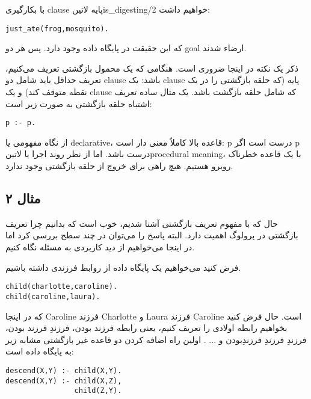 با بکارگیری clause‌ پایه ‌لاتین{is\_digesting/2} خواهیم داشت:

\begin{latin}
\begin{lstlisting}
just_ate(frog,mosquito).
\end{lstlisting}
\end{latin}

که این حقیقت در پایگاه داده وجود دارد. پس هر دو goal ارضاء شدند.

ذکر یک نکته در اینجا ضروری است. هنگامی که یک محمول بازگشتی تعریف می‌کنیم، تعریف حداقل باید شامل دو clause باشد: یک clause پایه (که حلقه بازگشتی را در یک نقطه متوقف کند) و یک clause که شامل حلقه بازگشت باشد. یک مثال ساده تعریف اشتباه حلقه بازگشتی به صورت زیر است:

\begin{latin}
\begin{lstlisting}
p :- p.
\end{lstlisting}
\end{latin}

از نگاه مفهومی یا declarative، قاعده بالا کاملاً معنی دار است: p درست است اگر p‌ درست باشد. اما از نظر روند اجرا یا ‌لاتین{procedural meaning}، با یک قاعده خطرناک روبرو هستیم. هیچ راهی برای خروج از حلقه بازگشتی وجود ندارد.

\subsection{مثال ۲}
حال که با مفهوم تعریف بازگشتی آشنا شدیم، خوب است که بدانیم چرا تعریف بازگشتی در پرولوگ اهمیت دارد. البته پاسخ را می‌توان در چند سطح بررسی کرد اما در اینجا می‌خواهیم از دید کاربردی به مسئله نگاه کنیم.

فرض کنید می‌خواهیم یک پایگاه داده از روابط فرزندی داشته باشیم.

\begin{latin}
\begin{lstlisting}
child(charlotte,caroline).
child(caroline,laura).
\end{lstlisting}
\end{latin}

که در اینجا Caroline فرزند Charlotte و Laura فرزند Caroline است. حال فرض کنید بخواهیم رابطه اولادی را تعریف کنیم، یعنی رابطه فرزند بودن، فرزندِ فرزند بودن، فرزندِ  فرزندِ  فرزندِبودن و ... . اولین راه اضافه کردن دو قاعده غیر بازگشتی مشابه زیر به پایگاه داده است:

\begin{latin}
\begin{lstlisting}
descend(X,Y) :- child(X,Y).
descend(X,Y) :- child(X,Z),
                child(Z,Y).
\end{lstlisting}
\end{latin}

